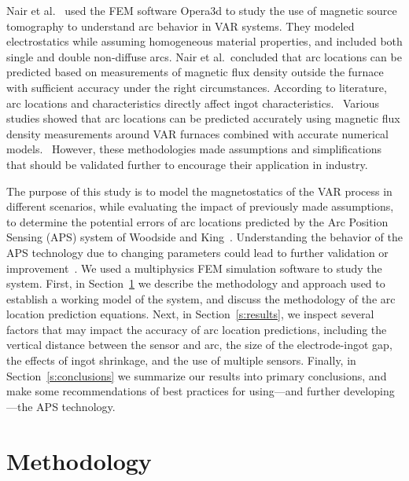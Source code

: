 \documentclass[onehalf,11pt]{beavtex}
\begin{document}
Nair et al.~\cite{Nair:2009ja} used the FEM software Opera3d to study the use of magnetic source tomography to understand arc behavior in VAR systems.
They modeled electrostatics while assuming homogeneous material properties, and included both single and double non-diffuse arcs.
Nair et al.\ concluded that arc locations can be predicted based on measurements of magnetic flux density outside the furnace with sufficient accuracy under the right circumstances. 
According to literature, arc locations and characteristics directly affect ingot characteristics.~\cite{Woodside:2013cf,Zhao:2011es,Nair:2009ja,Wang:2005fg,Pericleous:2013kb,Gartling:1997ka,Reiter:2003wk}
Various studies showed that arc locations can be predicted accurately using magnetic flux density measurements around VAR furnaces combined with accurate numerical models.~\cite{Woodside:2013cf,Nair:2009ja}
However, these methodologies made assumptions and simplifications that should be validated further to encourage their application in industry.

The purpose of this study is to model the magnetostatics of the VAR process in different scenarios, while evaluating the impact of previously made assumptions, to determine the potential errors of arc locations predicted by the Arc Position Sensing (APS) system of Woodside and King~\cite{Woodside:2010fi}.
Understanding the behavior of the APS technology due to changing parameters could lead to further validation or improvement~\cite{Nair:2009ja,Woodside:2013cf}.
We used a multiphysics FEM simulation software to study the system. 
First, in Section~\ref{s:methods} we describe the methodology and approach used to establish a working model of the system, and discuss the methodology of the arc location prediction equations.
Next, in Section~\ref{s:results}, we inspect several factors that may impact the accuracy of arc location predictions, including the vertical distance between the sensor and arc, the size of the electrode-ingot gap, the effects of ingot shrinkage, and the use of multiple sensors.
Finally, in Section~\ref{s:conclusions} we summarize our results into primary conclusions, and make some recommendations of best practices for using---and further developing---the APS technology.


\section{Methodology}
\label{s:methods}
\end{document}
